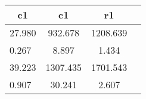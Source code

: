 \begin{table}[htbp]
\begin{tabular}{lccc} \hline \hline
 \multicolumn{1}{c}{ c1 }  & c1  & r1  \\  \hline 
   27.980 &   932.678 &  1208.639 \\  
    0.267 &     8.897 &     1.434 \\  
   39.223 &  1307.435 &  1701.543 \\  
    0.907 &    30.241 &     2.607 \\  
\hline \hline \end{tabular}
\end{table}
